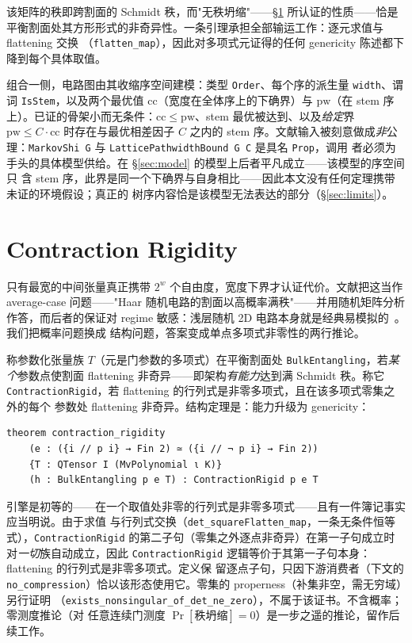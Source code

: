 \documentclass[11pt]{ctexart}
\newcommand{\cc}{\mathrm{cc}}
\newcommand{\pw}{\mathrm{pw}}
\begin{document}
该矩阵的秩即跨割面的 Schmidt 秩，而"无秩坍缩"——\S\ref{sec:rigidity} 所认证的性质——恰是
平衡割面处其方形形式的非奇异性。一条引理承担全部输运工作：逐元求值与 flattening 交换
（\texttt{flatten\_map}），因此对多项式元证得的任何 genericity 陈述都下降到每个具体取值。

组合一侧，电路图由其收缩序空间建模：类型 \texttt{Order}、每个序的派生量 \texttt{width}、谓
词 \texttt{IsStem}，以及两个最优值 $\cc$（宽度在全体序上的下确界）与 $\pw$（在 stem 序
上）。已证的骨架小而无条件：$\cc\le\pw$、stem 最优被达到、以及\emph{给定}界
$\pw\le C\cdot\cc$ 时存在与最优相差因子 $C$ 之内的 stem 序。文献输入被刻意做成\emph{非}公
理：\texttt{MarkovShi G} 与 \texttt{LatticePathwidthBound G C} 是具名 \texttt{Prop}，调用
者必须为手头的具体模型供给。在 \S\ref{sec:model} 的模型上后者平凡成立——该模型的序空间只
含 stem 序，此界是同一个下确界与自身相比——因此本文没有任何定理携带未证的环境假设；真正的
树序内容恰是该模型无法表达的部分（\S\ref{sec:limits}）。

\section{Contraction Rigidity}\label{sec:rigidity}

只有最宽的中间张量真正携带 $2^w$ 个自由度，宽度下界才认证代价。文献把这当作 average-case
问题——"Haar 随机电路的割面以高概率满秩"——并用随机矩阵分析作答，而后者的保证对 regime
敏感：浅层随机 2D 电路本身就是经典易模拟的~\cite{napp2022efficient}。我们把概率问题换成
结构问题，答案变成单点多项式非零性的两行推论。

称参数化张量族 $T$（元是门参数的多项式）在平衡割面处 \texttt{BulkEntangling}，若\emph{某
个}参数点使割面 flattening 非奇异——即架构\emph{有能力}达到满 Schmidt 秩。称它
\texttt{ContractionRigid}，若 flattening 的行列式是非零多项式，且在该多项式零集之外的每个
参数处 flattening 非奇异。结构定理是：能力升级为 genericity：

\begin{lstlisting}
theorem contraction_rigidity
    (e : ({i // p i} → Fin 2) ≃ ({i // ¬ p i} → Fin 2))
    {T : QTensor I (MvPolynomial ι K)}
    (h : BulkEntangling p e T) : ContractionRigid p e T
\end{lstlisting}

引擎是初等的——在一个取值处非零的行列式是非零多项式——且有一件簿记事实应当明说。由于求值
与行列式交换（\texttt{det\_squareFlatten\_map}，一条无条件恒等式），\texttt{ContractionRigid}
的第二子句（零集之外逐点非奇异）在第一子句成立时对\emph{一切}族自动成立，因此
\texttt{ContractionRigid} 逻辑等价于其第一子句本身：flattening 的行列式是非零多项式。定义保
留逐点子句，只因下游消费者（下文的 \texttt{no\_compression}）恰以该形态使用它。零集的
properness（补集非空，需无穷域）另行证明
（\texttt{exists\_nonsingular\_of\_det\_ne\_zero}），不属于该证书。不含概率；零测度推论（对
任意连续门测度 $\Pr[\text{秩坍缩}]=0$）是一步之遥的推论，留作后续工作。
\end{document}
